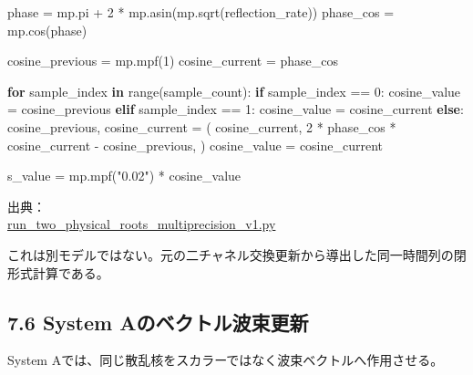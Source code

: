 \documentclass[
  10pt,
  a4paper,
]{article}
\newenvironment{Shaded}{}{}
\newcommand{\BuiltInTok}[1]{\textcolor[rgb]{0.00,0.50,0.00}{#1}}
\newcommand{\ControlFlowTok}[1]{\textcolor[rgb]{0.00,0.44,0.13}{\textbf{#1}}}
\newcommand{\DecValTok}[1]{\textcolor[rgb]{0.25,0.63,0.44}{#1}}
\newcommand{\KeywordTok}[1]{\textcolor[rgb]{0.00,0.44,0.13}{\textbf{#1}}}
\newcommand{\NormalTok}[1]{#1}
\newcommand{\OperatorTok}[1]{\textcolor[rgb]{0.40,0.40,0.40}{#1}}
\newcommand{\StringTok}[1]{\textcolor[rgb]{0.25,0.44,0.63}{#1}}
\begin{document}
\begin{Shaded}
\begin{Highlighting}[]
\NormalTok{phase }\OperatorTok{=}\NormalTok{ mp.pi }\OperatorTok{+} \DecValTok{2} \OperatorTok{*}\NormalTok{ mp.asin(mp.sqrt(reflection\_rate))}
\NormalTok{phase\_cos }\OperatorTok{=}\NormalTok{ mp.cos(phase)}

\NormalTok{cosine\_previous }\OperatorTok{=}\NormalTok{ mp.mpf(}\DecValTok{1}\NormalTok{)}
\NormalTok{cosine\_current }\OperatorTok{=}\NormalTok{ phase\_cos}

\ControlFlowTok{for}\NormalTok{ sample\_index }\KeywordTok{in} \BuiltInTok{range}\NormalTok{(sample\_count):}
    \ControlFlowTok{if}\NormalTok{ sample\_index }\OperatorTok{==} \DecValTok{0}\NormalTok{:}
\NormalTok{        cosine\_value }\OperatorTok{=}\NormalTok{ cosine\_previous}
    \ControlFlowTok{elif}\NormalTok{ sample\_index }\OperatorTok{==} \DecValTok{1}\NormalTok{:}
\NormalTok{        cosine\_value }\OperatorTok{=}\NormalTok{ cosine\_current}
    \ControlFlowTok{else}\NormalTok{:}
\NormalTok{        cosine\_previous, cosine\_current }\OperatorTok{=}\NormalTok{ (}
\NormalTok{            cosine\_current,}
            \DecValTok{2} \OperatorTok{*}\NormalTok{ phase\_cos }\OperatorTok{*}\NormalTok{ cosine\_current }\OperatorTok{{-}}\NormalTok{ cosine\_previous,}
\NormalTok{        )}
\NormalTok{        cosine\_value }\OperatorTok{=}\NormalTok{ cosine\_current}

\NormalTok{    s\_value }\OperatorTok{=}\NormalTok{ mp.mpf(}\StringTok{"0.02"}\NormalTok{) }\OperatorTok{*}\NormalTok{ cosine\_value}
\end{Highlighting}
\end{Shaded}

出典：\\
\href{run_two_physical_roots_multiprecision_v1.py\#L64-L106}{run\_two\_physical\_roots\_multiprecision\_v1.py}

これは別モデルではない。元の二チャネル交換更新から導出した同一時間列の閉形式計算である。

\subsection{7.6 System
Aのベクトル波束更新}\label{system-aux306eux30d9ux30afux30c8ux30ebux6ce2ux675fux66f4ux65b0}

System Aでは、同じ散乱核をスカラーではなく波束ベクトルへ作用させる。
\end{document}
